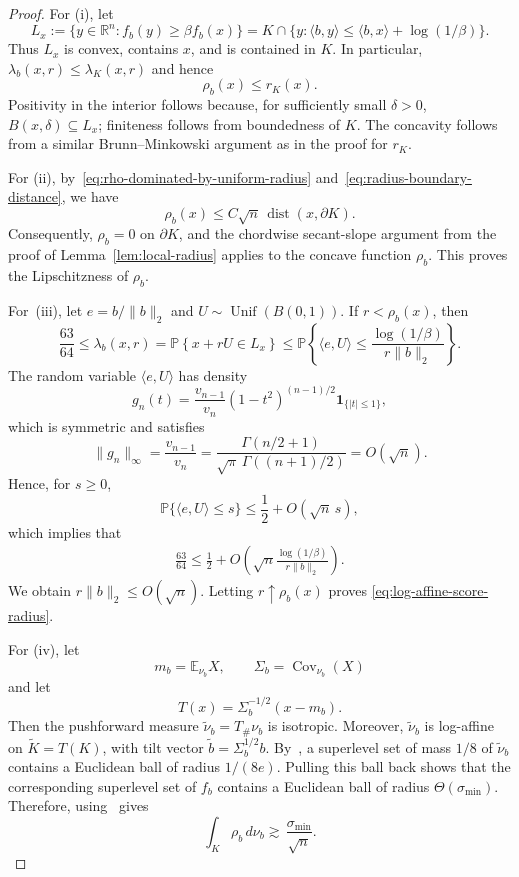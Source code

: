 \documentclass[11pt]{article}
\theoremstyle{definition}
\theoremstyle{remark}
\newcommand{\E}{\mathbb E}
\newcommand{\Prb}{\mathbb P}
\newcommand{\R}{\mathbb R}
\newcommand{\one}{\mathbf 1}
\begin{document}
\begin{proof}
For \textup{(i)}, let
\begin{equation}\label{eq:log-affine-moving-level-set}
 L_x:=\{y\in\R^n:f_b(y)\ge\beta f_b(x)\}
 =
 K\cap
 \{y:\langle b,y\rangle\le\langle b,x\rangle+\log(1/\beta)\}.
\end{equation}
Thus $L_x$ is convex, contains $x$, and is contained in $K$.  In particular, $\lambda_b(x,r)\le\lambda_K(x,r)$ and hence
\begin{equation}\label{eq:rho-dominated-by-uniform-radius}
 \rho_b(x)\le r_K(x).
\end{equation}
Positivity in the interior follows because, for sufficiently small $\delta>0$, $B(x,\delta)\subseteq L_x$; finiteness follows from boundedness of $K$. The concavity follows from a similar Brunn--Minkowski argument as in the proof for $r_K$.

For \textup{(ii)}, by~\eqref{eq:rho-dominated-by-uniform-radius} and~\eqref{eq:radius-boundary-distance}, we have
\[
 \rho_b(x)
 \le C\sqrt n\,\operatorname{dist}(x,\partial K).
\]
Consequently, $\rho_b=0$ on $\partial K$, and the chordwise secant-slope argument from the proof of Lemma~\ref{lem:local-radius} applies to the concave function $\rho_b$. This proves the Lipschitzness of $\rho_b$.

For~\textup{(iii)}, let $e=b/\|b\|_2$ and
$U\sim\operatorname{Unif}(B(0,1))$.  If $r<\rho_b(x)$, then
\[
 \frac{63}{64}
 \le\lambda_b(x,r) = \Prb\left\{
  x+rU\in L_x\right\}
 \le
 \Prb\left\{
  \langle e,U\rangle
  \le\frac{\log(1/\beta)}{r\|b\|_2}
 \right\}.
\]
The random variable $\langle e,U\rangle$ has density
\[
 g_n(t)
 =
 \frac{v_{n-1}}{v_n}(1-t^2)^{(n-1)/2}
 \one_{\{|t|\le1\}},
\]
which is symmetric and satisfies
\[
 \|g_n\|_\infty
 =
 \frac{v_{n-1}}{v_n}
 =
 \frac{\Gamma(n/2+1)}
 {\sqrt\pi\,\Gamma((n+1)/2)}
 =O(\sqrt{n}).
\]
Hence, for $s\ge0$,
\[
 \Prb\{\langle e,U\rangle\le s\}
 \le\frac12+O(\sqrt{n}\,s), 
\]
which implies that
\begin{align*}
    \frac{63}{64} \leq \frac{1}{2} +O\left(\sqrt{n}\frac{\log(1/\beta)}{r\|b\|_2}\right).
\end{align*}
We obtain $r\|b\|_2\le O(\sqrt n)$. Letting $r\uparrow\rho_b(x)$ proves
\eqref{eq:log-affine-score-radius}.

For \textup{(iv)}, let
\[
 m_b=\E_{\nu_b}X,
 \qquad
 \Sigma_b=\operatorname{Cov}_{\nu_b}(X)
\]
and let
\[
 T(x)=\Sigma_b^{-1/2}(x-m_b).
\]
Then the pushforward measure $\widetilde\nu_b=T_\#\nu_b$ is isotropic. Moreover, $\widetilde\nu_b$ is log-affine on
$\widetilde K=T(K)$, with tilt vector $\widetilde b=\Sigma_b^{1/2}b$. By~\cite[Lemma~5.13]{LVlogconcave}, a superlevel set of mass $1/8$ of $\widetilde \nu_b$ contains a Euclidean ball of radius $1/(8e)$.  Pulling this ball back shows that the corresponding superlevel set of $f_b$ contains a Euclidean ball of radius $\Theta(\sigma_{\min})$.  Therefore, using~\cite[Lemma~6.4]{LV} gives
\[
 \int_K\rho_b\,d\nu_b
 \gtrsim \,\frac{\sigma_{\min}}{\sqrt n}.
\]
\end{proof}
\end{document}

